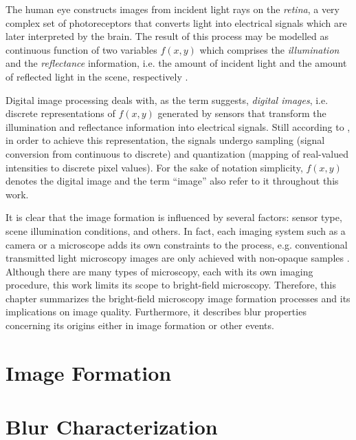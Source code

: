 



The human eye constructs images from incident light rays on the \emph{retina}, a very complex set of photoreceptors that converts light into electrical signals which are later interpreted by the brain. The result of this process may be modelled as continuous function of two variables $f(x,y)$ which comprises the \emph{illumination} and the \emph{reflectance} information, i.e. the amount of incident light and the amount of reflected light in the scene, respectively \cite{gonzalez2018digital}.

Digital image processing deals with, as the term suggests, \emph{digital images}, i.e. discrete representations of $f(x,y)$ generated by sensors that transform the illumination and reflectance information into electrical signals. Still according to , in order to achieve this representation, the signals undergo sampling (signal conversion from continuous to discrete) and quantization (mapping of real-valued intensities to discrete pixel values). For the sake of notation simplicity, $f(x,y)$ denotes the digital image and the term ``image'' also refer to it throughout this work.

It is clear that the image formation is influenced by several factors: sensor type, scene illumination conditions, and others. In fact, each imaging system such as a camera or a microscope adds its own constraints to the process, e.g. conventional transmitted light microscopy images are only achieved with non-opaque samples \cite{rudi2020contrast}. Although there are many types of microscopy, each with its own imaging procedure, this work limits its scope to bright-field microscopy. Therefore, this chapter summarizes the bright-field microscopy image formation processes and its implications on image quality. Furthermore, it describes blur properties concerning its origins either in image formation or other events. 

\section{Image Formation}


\section{Blur Characterization}

